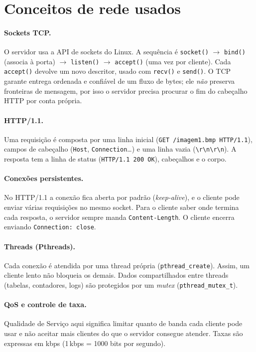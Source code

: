 \documentclass[11pt,a4paper]{article}
\begin{document}
\section{Conceitos de rede usados}

\paragraph{Sockets TCP.} O servidor usa a API de sockets do Linux. A sequência é
\texttt{socket()} $\rightarrow$ \texttt{bind()} (associa à porta) $\rightarrow$
\texttt{listen()} $\rightarrow$ \texttt{accept()} (uma vez por cliente). Cada
\texttt{accept()} devolve um novo descritor, usado com \texttt{recv()} e \texttt{send()}.
O TCP garante entrega ordenada e confiável de um fluxo de bytes; ele \emph{não} preserva
fronteiras de mensagem, por isso o servidor precisa procurar o fim do cabeçalho HTTP por conta própria.

\paragraph{HTTP/1.1.} Uma requisição é composta por uma linha inicial
(\texttt{GET /imagem1.bmp HTTP/1.1}), campos de cabeçalho (\texttt{Host}, \texttt{Connection}\ldots)
e uma linha vazia (\texttt{\textbackslash r\textbackslash n\textbackslash r\textbackslash n}).
A resposta tem a linha de status (\texttt{HTTP/1.1 200 OK}), cabeçalhos e o corpo.

\paragraph{Conexões persistentes.} No HTTP/1.1 a conexão fica aberta por padrão
(\emph{keep-alive}), e o cliente pode enviar várias requisições no mesmo socket. Para
o cliente saber onde termina cada resposta, o servidor sempre manda \texttt{Content-Length}.
O cliente encerra enviando \texttt{Connection: close}.

\paragraph{Threads (Pthreads).} Cada conexão é atendida por uma thread própria
(\texttt{pthread\_create}). Assim, um cliente lento não bloqueia os demais. Dados
compartilhados entre threads (tabelas, contadores, logs) são protegidos por um
\emph{mutex} (\texttt{pthread\_mutex\_t}).

\paragraph{QoS e controle de taxa.} Qualidade de Serviço aqui significa limitar quanto
de banda cada cliente pode usar e não aceitar mais clientes do que o servidor consegue
atender. Taxas são expressas em kbps (1\,kbps = 1000 bits por segundo).
\end{document}
